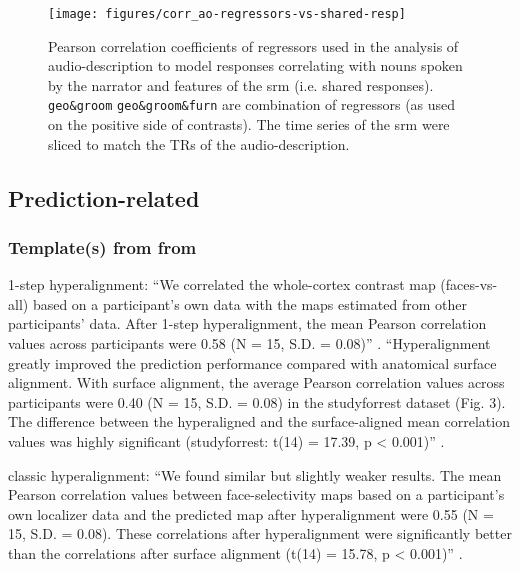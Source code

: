 

\begin{figure*}[tbp]
\centering
    \texttt{[image: figures/corr\_ao-regressors-vs-shared-resp]}
    \caption{Pearson correlation coefficients of regressors used in the analysis
    of audio-description to model responses correlating with nouns spoken by the
    narrator and features of the \ac{srm} (i.e. shared responses).
    \texttt{geo\&groom} \texttt{geo\&groom\&furn} are combination of regressors
    (as used on the positive side of contrasts). The
    time series of the \ac{srm} were sliced to match the TRs of the
    audio-description.
      }
\label{fig:reg-corr}
\end{figure*}


\subsection{Prediction-related}

\subsubsection{Template(s) from from \citet{jiahui2020predicting}}

1-step hyperalignment: ``We correlated the whole-cortex contrast map
(faces-vs-all) based on a participant's own data with the maps estimated from
other participants' data.  After 1-step hyperalignment, the mean Pearson
correlation values across participants were 0.58 (N = 15, S.D. = 0.08)''
\citep{jiahui2020predicting}.
%
``Hyperalignment greatly improved the prediction performance compared with
anatomical surface alignment. With surface alignment, the average Pearson
correlation values across participants were 0.40 (N = 15, S.D. = 0.08) in the
studyforrest dataset (Fig. 3). The difference between the hyperaligned and the
surface-aligned mean correlation values was highly significant (studyforrest:
t(14) = 17.39, p < 0.001)'' \citep{jiahui2020predicting}.

%
classic hyperalignment: ``We found similar but slightly weaker results. The mean
Pearson correlation values between face-selectivity maps based on a
participant's own localizer data and the predicted map after hyperalignment were
0.55 (N = 15, S.D. = 0.08). These correlations after hyperalignment were
significantly better than the correlations after surface alignment (t(14) =
15.78, p < 0.001)'' \citep{jiahui2020predicting}.


